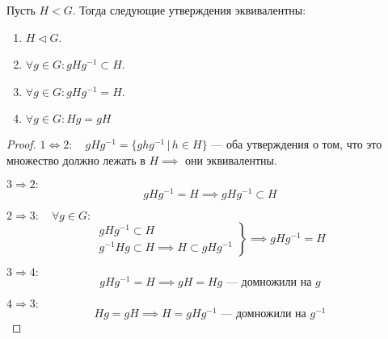 \documentclass[../main.tex]{subfiles}
\begin{document}
\begin{theorem-non}
    Пусть $H < G$. Тогда следующие утверждения эквивалентны:
    \begin{enumerate}
        \item $H \triangleleft G$.
        \item $\forall g \in G\colon gHg^{-1} \subset H$.
        \item $\forall g \in G\colon gHg^{-1} = H$.
        \item $\forall g \in G\colon Hg = gH$
     \end{enumerate}
\end{theorem-non}
\begin{proof}
    $1 \Leftrightarrow 2\colon \quad gHg^{-1} = \{ghg^{-1} \, | \, h \in H\}$ --- оба утверждения о том, что это множество должно лежать в $H \implies$ они эквивалентны.

    $3 \Rightarrow 2\colon$
    \begin{equation*}
        gHg^{-1} = H \implies gHg^{-1} \subset H
    \end{equation*}

    $2 \Rightarrow 3\colon \quad \forall g \in G\colon$
    \begin{equation*}
        \left.
        \begin{gathered}
            gHg^{-1} \subset H \\
            g^{-1}Hg \subset H \implies H \subset gHg^{-1}
        \end{gathered}
        \right \}
        \implies gHg^{-1} = H
    \end{equation*}

    $3 \Rightarrow 4\colon$
    \begin{equation*}
        gHg^{-1} = H \implies gH = Hg\text{ --- домножили на $g$}
    \end{equation*}

    $4 \Rightarrow 3\colon$
    \begin{equation*}
        Hg = gH \implies H = gHg^{-1}\text{ --- домножили на $g^{-1}$}
    \end{equation*}
\end{proof}
\end{document}
